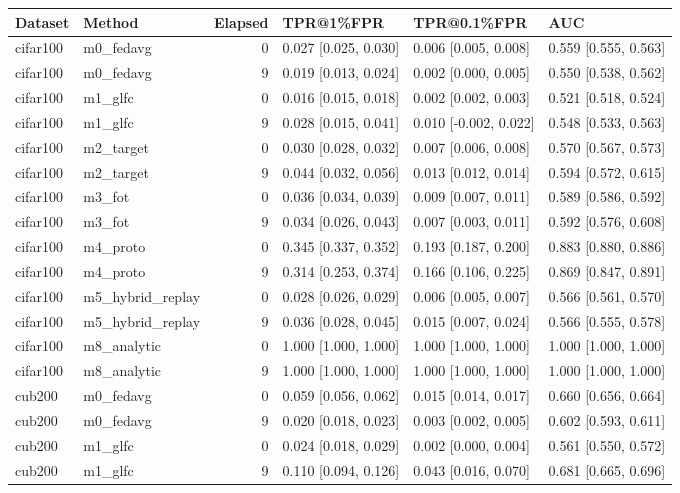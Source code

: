 \begin{tabular}{llrlll}
\toprule
Dataset & Method & Elapsed & TPR@1\%FPR & TPR@0.1\%FPR & AUC \\
\midrule
cifar100 & m0\_fedavg & 0 & 0.027 [0.025, 0.030] & 0.006 [0.005, 0.008] & 0.559 [0.555, 0.563] \\
cifar100 & m0\_fedavg & 9 & 0.019 [0.013, 0.024] & 0.002 [0.000, 0.005] & 0.550 [0.538, 0.562] \\
cifar100 & m1\_glfc & 0 & 0.016 [0.015, 0.018] & 0.002 [0.002, 0.003] & 0.521 [0.518, 0.524] \\
cifar100 & m1\_glfc & 9 & 0.028 [0.015, 0.041] & 0.010 [-0.002, 0.022] & 0.548 [0.533, 0.563] \\
cifar100 & m2\_target & 0 & 0.030 [0.028, 0.032] & 0.007 [0.006, 0.008] & 0.570 [0.567, 0.573] \\
cifar100 & m2\_target & 9 & 0.044 [0.032, 0.056] & 0.013 [0.012, 0.014] & 0.594 [0.572, 0.615] \\
cifar100 & m3\_fot & 0 & 0.036 [0.034, 0.039] & 0.009 [0.007, 0.011] & 0.589 [0.586, 0.592] \\
cifar100 & m3\_fot & 9 & 0.034 [0.026, 0.043] & 0.007 [0.003, 0.011] & 0.592 [0.576, 0.608] \\
cifar100 & m4\_proto & 0 & 0.345 [0.337, 0.352] & 0.193 [0.187, 0.200] & 0.883 [0.880, 0.886] \\
cifar100 & m4\_proto & 9 & 0.314 [0.253, 0.374] & 0.166 [0.106, 0.225] & 0.869 [0.847, 0.891] \\
cifar100 & m5\_hybrid\_replay & 0 & 0.028 [0.026, 0.029] & 0.006 [0.005, 0.007] & 0.566 [0.561, 0.570] \\
cifar100 & m5\_hybrid\_replay & 9 & 0.036 [0.028, 0.045] & 0.015 [0.007, 0.024] & 0.566 [0.555, 0.578] \\
cifar100 & m8\_analytic & 0 & 1.000 [1.000, 1.000] & 1.000 [1.000, 1.000] & 1.000 [1.000, 1.000] \\
cifar100 & m8\_analytic & 9 & 1.000 [1.000, 1.000] & 1.000 [1.000, 1.000] & 1.000 [1.000, 1.000] \\
cub200 & m0\_fedavg & 0 & 0.059 [0.056, 0.062] & 0.015 [0.014, 0.017] & 0.660 [0.656, 0.664] \\
cub200 & m0\_fedavg & 9 & 0.020 [0.018, 0.023] & 0.003 [0.002, 0.005] & 0.602 [0.593, 0.611] \\
cub200 & m1\_glfc & 0 & 0.024 [0.018, 0.029] & 0.002 [0.000, 0.004] & 0.561 [0.550, 0.572] \\
cub200 & m1\_glfc & 9 & 0.110 [0.094, 0.126] & 0.043 [0.016, 0.070] & 0.681 [0.665, 0.696] \\

\end{tabular}
